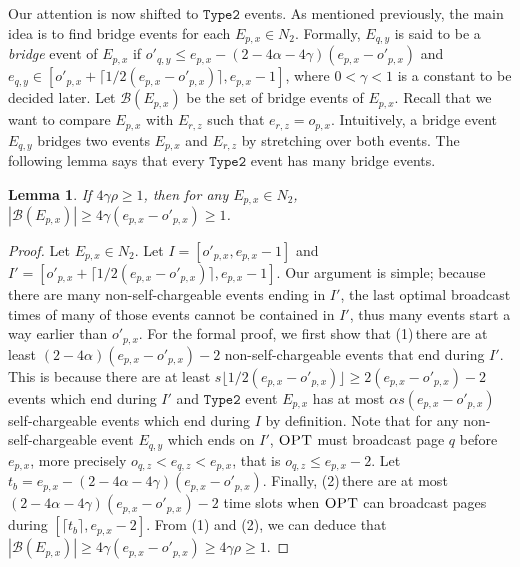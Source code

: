 \documentclass[11pt]{article}
\newtheorem{lemma}{Lemma}[section]
\newcommand{\opt}{\textrm{\sc OPT}}
\newcommand{\two}{\texttt{Type2}}
\newcommand{\len}{\mathfrak{\rho}}
\begin{document}
\begin{titlepage}
Our attention is now shifted to $\two$ events. As mentioned previously, the main idea is to find bridge events for each
$E_{p,x} \in N_2$. Formally, $E_{q,y}$ is said to be a \emph{bridge} event of $E_{p,x}$ if $o'_{q,y} \leq e_{p,x} - (2
- 4\alpha - 4\gamma )(e_{p,x}-o'_{p,x})$ and $e_{q,y} \in [o'_{p,x} + \lceil 1/2(e_{p,x}-o'_{p,x}) \rceil, e_{p,x}-1]$,
where $0<\gamma<1$ is a constant to be decided later. Let $\mathcal{B}(E_{p,x})$ be the set of bridge events of
$E_{p,x}$. Recall that we want to compare $E_{p,x}$ with $E_{r,z}$ such that $e_{r,z} = o_{p,x}$. Intuitively, a bridge
event $E_{q,y}$ bridges two events $E_{p,x}$ and $E_{r,z}$ by stretching over both events.   The following lemma says
that every $\two$ event has many bridge events.

\begin{lemma}
  \label{lem:bdg_num} If $4 \gamma \len \geq 1$, then for any $E_{p,x}
  \in N_2$, $|\mathcal{B}(E_{p,x})| \geq 4 \gamma
  (e_{p,x}-o'_{p,x})\geq 1$.
\end{lemma}
\begin{proof}
  Let $E_{p,x} \in N_2$. Let $I = [o'_{p,x}, e_{p,x}-1]$ and $I' =
  [o'_{p,x} + \lceil 1/2(e_{p,x}-o'_{p,x}) \rceil, e_{p,x}-1]$.
  Our argument is simple; because there are many non-self-chargeable events ending in $I'$,
  the last optimal broadcast times of many of those events cannot be contained in $I'$, thus many events start a way
  earlier than $o'_{p,x}$. For the formal proof, we first show that
  (1)$\,$there are at least $(2 - 4 \alpha)(e_{p,x}-o'_{p,x}) -2$
  non-self-chargeable events that end during $I'$. This is because
  there are at least $s \lfloor 1/2(e_{p,x}-o'_{p,x}) \rfloor \geq 2(e_{p,x}-o'_{p,x})-2$ events which end during
  $I'$ and $\two$ event $E_{p,x}$ has at most $\alpha s
  (e_{p,x}-o'_{p,x})$ self-chargeable events which end during
  $I$ by definition. Note that for any non-self-chargeable event $E_{q,y}$ which
  ends on $I'$, $\opt$ must broadcast  page $q$ before $e_{p,x}$,
  more precisely $o_{q,z} < e_{q,z} < e_{p,x}$, that is $o_{q,z} \leq
  e_{p,x} -2$. Let $t_b = e_{p,x} - (2 - 4\alpha - 4\gamma
  )(e_{p,x}-o'_{p,x})$.  Finally, (2)$\,$there are at most $(2 -
  4\alpha - 4\gamma)(e_{p,x} - o'_{p,x}) - 2$ time slots when $\opt$
  can broadcast pages during $[\lceil t_b \rceil, e_{p,x}-2]$.
  From (1) and (2), we can deduce that $|\mathcal{B}(E_{p,x})| \geq 4 \gamma
  (e_{p,x}-o'_{p,x}) \geq 4 \gamma \len \geq 1$.

\iffalse
  From (1) and (2), we
  can deduce that $|\mathcal{B}(E_{p,x})| \geq ((2 - 4
  \alpha)(e_{p,x}-o'_{p,x}) -2) - ((2 - 4\alpha - 4\gamma)(e_{p,x} -
  o'_{p,x}) - 2) = 4\gamma (e_{p,x}-o'_{p,x}) \geq 4 \gamma \len \geq 1$.
\fi
\end{proof}


\end{titlepage}
\end{document}
